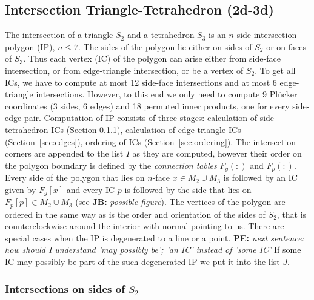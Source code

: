 \documentclass{elsarticle}
\newcommand{\noteJB}[1]{{\color{Blue} \textbf{JB: } \textit{#1}}}
\newcommand{\notePE}[1]{{\color{Orange} \textbf{PE: } \textit{#1}}}
\newcommand{\plucker}{Pl\"{u}cker }
\newcommand{\nface}{$n$-face }
\begin{document}
\subsection{Intersection Triangle-Tetrahedron (2d-3d)}
The intersection of a triangle $S_2$ and a tetrahedron $S_3$ is an $n$-side intersection polygon (IP), $n\le 7$. The sides of the polygon
lie either on sides of $S_2$ or on faces of $S_3$. Thus each vertex (IC) of the polygon
can arise either from side-face intersection, or from edge-triangle intersection, or be a vertex of $S_2$.
To get all ICs, we have to compute at most 12 side-face intersections and at most 6 edge-triangle intersections. However,
to this end we only need to compute 9 \plucker coordinates (3 sides, 6 edges) and 18 permuted inner products, one for every side-edge pair.
Computation of IP consists of three stages: calculation of side-tetrahedron ICs (Section \ref{sec:sides}), 
calculation of edge-triangle ICs (Section~\ref{sec:edges}), ordering of ICs (Section~\ref{sec:ordering}).
The intersection corners are appended to the list $I$ as they are computed, however their order on the polygon boundary is 
defined by the \emph{connection tables} $F_g(:)$ and $F_p(:)$. Every side of the polygon that lies on \nface $x\in M_2\cup M_3$ is followed by an IC given by $F_g[x]$ 
and every IC $p$ is followed by the side that lies on $F_p[p]\in M_2\cup M_3$ (see \noteJB{possible figure}). The vertices of the polygon are ordered in the same 
way as is the order and orientation of the sides of $S_2$, that is counterclockwise around the interior with normal pointing to us.
There are special cases when the IP is degenerated to a line or a point. 
\notePE{next sentence: how should I understand 'may possibly be'; 'an IC' instead of 'some IC'}
If some IC may possibly be part of the such degenerated IP we put it into the list $J$. 


\subsubsection{Intersections on sides of $S_2$}
\label{sec:sides}
\end{document}
